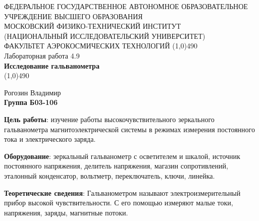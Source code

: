 \documentclass[a4paper,12pt]{article}
\begin{document}
\begin{titlepage}
\begin{center}
\large{\small ФЕДЕРАЛЬНОЕ ГОСУДАРСТВЕННОЕ АВТОНОМНОЕ ОБРАЗОВАТЕЛЬНОЕ\\ УЧРЕЖДЕНИЕ ВЫСШЕГО ОБРАЗОВАНИЯ \\ МОСКОВСКИЙ ФИЗИКО-ТЕХНИЧЕСКИЙ ИНСТИТУТ\\ (НАЦИОНАЛЬНЫЙ ИССЛЕДОВАТЕЛЬСКИЙ УНИВЕРСИТЕТ)\\ ФАКУЛЬТЕТ АЭРОКОСМИЧЕСКИХ ТЕХНОЛОГИЙ}
\vfill
\line(1,0){490}\\[1mm]
\huge{Лабораторная работа 4.9}\\
\huge\textbf{Исследование гальванометра}\\
\line(1,0){490}\\[1mm]
\vfill
\begin{flushright}
\normalsize{Рогозин Владимир}\\
\normalsize{\textbf{Группа Б03-106}}\\
\end{flushright}
\end{center}
\end{titlepage}


\textbf{Цель работы}: изучение работы высокочувствительного зеркального
гальванометра магнитоэлектрической системы в режимах измерения постоянного тока и электрического заряда.

\textbf{Оборудование}: зеркальный гальванометр с осветителем и шкалой, источник постоянного напряжения, делитель напряжения, магазин сопротивлений, эталонный
конденсатор, вольтметр, переключатель, ключи, линейка.

\textbf{Теоретические сведения}: Гальванометром называют электроизмерительный прибор высокой чувствительности. С его помощью измеряют малые токи, напряжения, заряды, магнитные потоки. 
\end{document}

